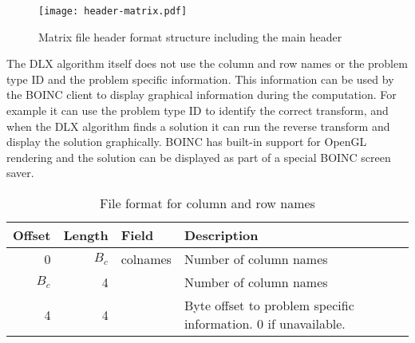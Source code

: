 \begin{figure}[htbp]
	\centering
	\texttt{[image: header-matrix.pdf]}
	\caption{Matrix file header format structure including the main header}
	\label{fig:header-matrix}
\end{figure}


The DLX algorithm itself does not use the column and row names or the problem type ID and the problem specific information.
This information can be used by the BOINC client to display graphical information during the computation.
For example it can use the problem type ID to identify the correct transform, and when the DLX algorithm finds a solution it can run the reverse transform and display the solution graphically.
BOINC has built-in support for OpenGL rendering and the solution can be displayed as part of a special BOINC screen saver.

\begin{table}[htbp]
	\centering
	\begin{tabular}{|r|r|l|p{2.6in}|}
		\hline
		\bf Offset & \bf Length & \bf Field & \bf Description \\ \hline
		0     & $B_c$ & colnames & Number of column names \\ \hline
		$B_c$ & 4     &  & Number of column names \\ \hline
		4     & 4     &   & Byte offset to problem specific information. 0 if unavailable. \\ \hline
	\end{tabular}
	\caption{File format for column and row names}
	\label{tab:colrowformat}
\end{table}

